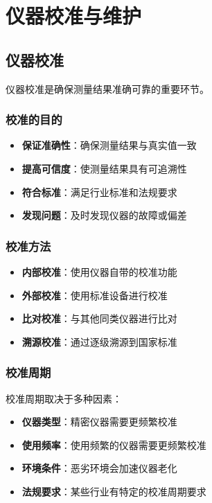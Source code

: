
\chapter{仪器校准与维护}
\label{chap:calibration_maintenance}

\section{仪器校准}
\label{sec:instrument_calibration}

仪器校准是确保测量结果准确可靠的重要环节。

\subsection{校准的目的}
\begin{itemize}
    \item \textbf{保证准确性}：确保测量结果与真实值一致
    \item \textbf{提高可信度}：使测量结果具有可追溯性
    \item \textbf{符合标准}：满足行业标准和法规要求
    \item \textbf{发现问题}：及时发现仪器的故障或偏差
\end{itemize}

\subsection{校准方法}
\begin{itemize}
    \item \textbf{内部校准}：使用仪器自带的校准功能
    \item \textbf{外部校准}：使用标准设备进行校准
    \item \textbf{比对校准}：与其他同类仪器进行比对
    \item \textbf{溯源校准}：通过逐级溯源到国家标准
\end{itemize}

\subsection{校准周期}

校准周期取决于多种因素：
\begin{itemize}
    \item \textbf{仪器类型}：精密仪器需要更频繁校准
    \item \textbf{使用频率}：使用频繁的仪器需要更频繁校准
    \item \textbf{环境条件}：恶劣环境会加速仪器老化
    \item \textbf{法规要求}：某些行业有特定的校准周期要求
\end{itemize}

